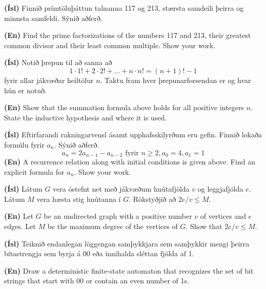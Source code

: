 \documentclass[addpoints]{exam}
\begin{document}
\begin{questions}
\newpage

\question[10]

\textbf{(Ísl)} Finnið prímtöluþáttun talnanna 117 og 213, stærsta samdeili þeirra og minnsta samfeldi. Sýnið aðferð.

\textbf{(En)} Find the prime factorizations of the numbers 117 and 213, their greatest common divisor and their least common multiple. Show your work.


\newpage

\question[10] 

\textbf{(Ísl)} Notið þrepun til að sanna að \[1\cdot1! + 2\cdot2! + \ldots + n \cdot n! = (n+1)!-1\] fyrir allar jákvæðar heiltölur $n$. Taktu fram hver þrepunarforsendan er og hvar hún er notuð.

\textbf{(En)} Show that the summation formula above holds for all positive integers $n$. State the inductive hypothesis and where it is used.


\newpage

\question[10] 

\textbf{(Ísl)} Eftirfarandi rakningarvensl ásamt upphafsskilyrðum eru gefin. Finnið lokaða formúlu fyrir $a_n$. Sýnið aðferð.
\[
    a_n = 2a_{n-1} - a_{n-2} \text{ fyrir } n\geq2, a_0 =4, a_1 = 1
\]
\textbf{(En)} A recurrence relation along with initial conditions is given above. Find an explicit formula for $a_n$. Show your work.


\newpage

\question[10] 

\textbf{(Ísl)} Látum $G$ vera óstefnt net með jákvæðum hnútafjölda $v$ og leggjafjölda $e$. Látum $M$ vera hæsta stig hnútanna í $G$. Rökstyðjið að $2e/v \leq M$.

\textbf{(En)} Let $G$ be an undirected graph with a positive number $v$ of vertices and $e$ edges. Let $M$ be the maximum degree of the vertices of $G$. Show that $2e/v \leq M$.


\newpage

\question[10] 

\textbf{(Ísl)} Teiknið endanlegan löggengan samþykkjara sem samþykkir mengi þeirra bitastrengja sem byrja á 00 eða innihalda sléttan fjölda af 1.

\textbf{(En)} Draw a deterministic finite-state automaton that recognizes the set of bit strings that start with 00 or contain an even number of 1s.


\newpage

\end{questions}
\end{document}
